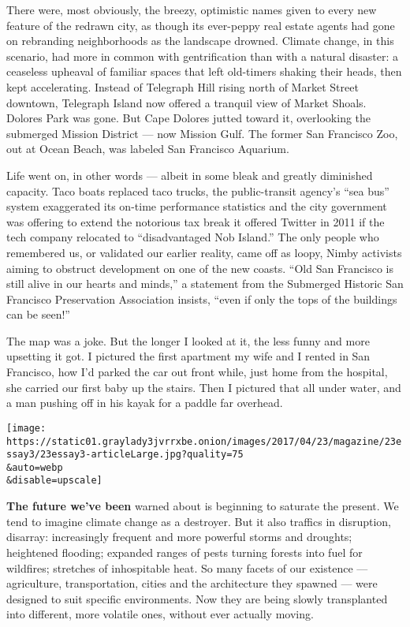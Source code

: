 There were, most obviously, the breezy, optimistic names given to every
new feature of the redrawn city, as though its ever-peppy real estate
agents had gone on rebranding neighborhoods as the landscape drowned.
Climate change, in this scenario, had more in common with gentrification
than with a natural disaster: a ceaseless upheaval of familiar spaces
that left old-timers shaking their heads, then kept accelerating.
Instead of Telegraph Hill rising north of Market Street downtown,
Telegraph Island now offered a tranquil view of Market Shoals. Dolores
Park was gone. But Cape Dolores jutted toward it, overlooking the
submerged Mission District --- now Mission Gulf. The former San
Francisco Zoo, out at Ocean Beach, was labeled San Francisco Aquarium.

Life went on, in other words --- albeit in some bleak and greatly
diminished capacity. Taco boats replaced taco trucks, the public-transit
agency's ``sea bus'' system exaggerated its on-time performance
statistics and the city government was offering to extend the notorious
tax break it offered Twitter in 2011 if the tech company relocated to
``disadvantaged Nob Island.'' The only people who remembered us, or
validated our earlier reality, came off as loopy, Nimby activists aiming
to obstruct development on one of the new coasts. ``Old San Francisco is
still alive in our hearts and minds,'' a statement from the Submerged
Historic San Francisco Preservation Association insists, ``even if only
the tops of the buildings can be seen!''

The map was a joke. But the longer I looked at it, the less funny and
more upsetting it got. I pictured the first apartment my wife and I
rented in San Francisco, how I'd parked the car out front while, just
home from the hospital, she carried our first baby up the stairs. Then I
pictured that all under water, and a man pushing off in his kayak for a
paddle far overhead.

\texttt{[image: https://static01.graylady3jvrrxbe.onion/images/2017/04/23/magazine/23essay3/23essay3-articleLarge.jpg?quality=75\\\&auto=webp\\\&disable=upscale]}

\textbf{The future we've been} warned about is beginning to saturate the
present. We tend to imagine climate change as a destroyer. But it also
traffics in disruption, disarray: increasingly frequent and more
powerful storms and droughts; heightened flooding; expanded ranges of
pests turning forests into fuel for wildfires; stretches of inhospitable
heat. So many facets of our existence --- agriculture, transportation,
cities and the architecture they spawned --- were designed to suit
specific environments. Now they are being slowly transplanted into
different, more volatile ones, without ever actually moving.

